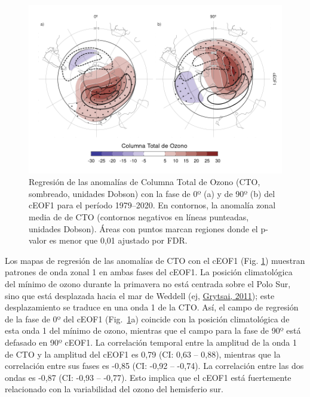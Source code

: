 \documentclass[12pt,oneside,a4paper]{reedthesis}
\begin{document}
\begin{figure}

{\centering \includegraphics{figures/20-ceofs/o3-regr-1} 

}

\caption{Regresión de las anomalías de Columna Total de Ozono (CTO, sombreado, unidades Dobson) con la fase de 0º (a) y de 90º (b) del cEOF1 para el período 1979--2020. En contornos, la anomalía zonal media de de CTO (contornos negativos en líneas punteadas, unidades Dobson). Áreas con puntos marcan regiones donde el p-valor es menor que 0,01 ajustado por FDR.}\label{fig:o3-regr}
\end{figure}



Los mapas de regresión de las anomalías de CTO con el cEOF1 (Fig. \ref{fig:o3-regr}) muestran patrones de onda zonal 1 en ambas fases del cEOF1.
La posición climatológica del mínimo de ozono durante la primavera no está centrada sobre el Polo Sur, sino que está desplazada hacia el mar de Weddell (ej, \protect\hyperlink{ref-grytsai2011}{Grytsai, 2011}); este desplazamiento se traduce en una onda 1 de la CTO.
Así, el campo de regresión de la fase de 0º del cEOF1 (Fig.~\ref{fig:o3-regr}a) coincide con la posición climatológica de esta onda 1 del mínimo de ozono, mientras que el campo para la fase de 90º está defasado en 90º cEOF1.
La correlación temporal entre la amplitud de la onda 1 de CTO y la amplitud del cEOF1 es 0,79 (CI: 0,63 -- 0,88), mientras que la correlación entre sus fases es -0,85 (CI: -0,92 -- -0,74).
La correlación entre las dos ondas es -0,87 (CI: -0,93 -- -0,77).
Esto implica que el cEOF1 está fuertemente relacionado con la variabilidad del ozono del hemisferio sur.
\end{document}
